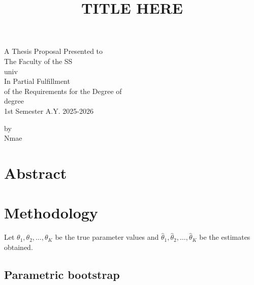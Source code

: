 \documentclass[
  12pt,
  a4paper,
]{article}
\author{}
\date{\vspace{-2.5em}}
\newenvironment{Shaded}{\begin{snugshade}}{\end{snugshade}}
\newcommand{\AttributeTok}[1]{\textcolor[rgb]{0.00,0.34,0.68}{#1}}
\newcommand{\ConstantTok}[1]{\textcolor[rgb]{0.67,0.33,0.00}{#1}}
\newcommand{\FunctionTok}[1]{\textcolor[rgb]{0.39,0.29,0.61}{#1}}
\newcommand{\NormalTok}[1]{\textcolor[rgb]{0.12,0.11,0.11}{#1}}
\newcommand{\SpecialCharTok}[1]{\textcolor[rgb]{0.24,0.68,0.91}{#1}}
\numberwithin{equation}{section}
\begin{document}
\title{\vspace{20mm}TITLE HERE}
\maketitle
\thispagestyle{empty} 
\vspace*{95px}
\begin{center}
A Thesis Proposal Presented to\\
The Faculty of the SS\\
univ\\
\vspace*{100px}
In Partial Fulfillment\\
of the Requirements for the Degree of\\
degree\\
1st Semester A.Y. 2025-2026

\vspace*{100px}
by\\
Nmae
\end{center}

\newpage

\begin{Shaded}
\end{Shaded}

\section*{Abstract}\label{abstract}

\newpage

\tableofcontents

\newpage

\section{Methodology}\label{methodology}

Let \(\theta_1, \theta_2, \dots, \theta_K\) be the true parameter values and \(\hat \theta_1, \hat \theta_2, \dots, \hat \theta_K\) be the estimates obtained.

\subsection{Parametric bootstrap}\label{parametric-bootstrap}
\end{document}
